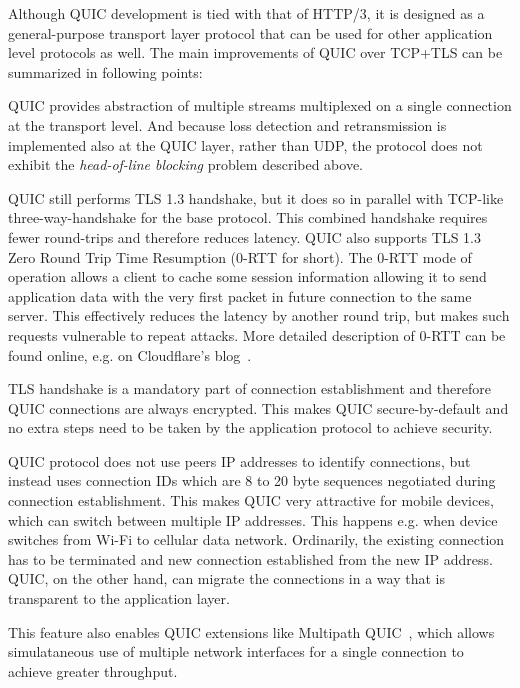 
Although QUIC development is tied with that of HTTP/3, it is designed as a general-purpose transport
layer protocol that can be used for other application level protocols as well. The main improvements
of QUIC over TCP+TLS can be summarized in following points:

\begin{itemize}
    QUIC provides abstraction of multiple streams multiplexed on a single connection at the
    transport level. And because loss detection and retransmission is implemented also at the QUIC
    layer, rather than UDP, the protocol does not exhibit the \textit{head-of-line blocking}
    problem described above.

   QUIC still performs TLS 1.3 handshake, but it does so in
    parallel with TCP-like three-way-handshake for the base protocol. This combined handshake
    requires fewer round-trips and therefore reduces latency. QUIC also supports TLS 1.3 Zero Round
    Trip Time Resumption (0-RTT for short). The 0-RTT mode of operation allows a client to cache
    some session information allowing it to send application data with the very first packet in
    future connection to the same server. This effectively reduces the latency by another round
    trip, but makes such requests vulnerable to repeat attacks. More detailed description of 0-RTT
    can be found online, e.g\@. on Cloudflare's blog~\cite{cloudflare-0rtt}.

   TLS handshake is a mandatory part of connection establishment and
    therefore QUIC connections are always encrypted. This makes QUIC secure-by-default and no extra
    steps need to be taken by the application protocol to achieve security.

   QUIC protocol does not use peers
    IP addresses to identify connections, but instead uses connection IDs which are 8 to 20 byte
    sequences negotiated during connection establishment. This makes QUIC very attractive for
    mobile devices, which can switch between multiple IP addresses. This happens e.g\@. when device
    switches from Wi-Fi to cellular data network. Ordinarily, the existing connection has to be terminated and new connection established from the new IP address. QUIC, on the other hand, can migrate the connections in a way that is transparent to the application layer.

    This feature also enables QUIC extensions like Multipath
    QUIC~\cite{draft-deconinck-quic-multipath-04}, which allows simulataneous use of multiple
    network interfaces for a single connection to achieve greater throughput.

\end{itemize}

